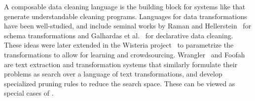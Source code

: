 
 A composable data cleaning language is the building block for systems like \sys that generate understandable cleaning programs.   Languages for data transformations have been well-studied, and include seminal works by Raman and Hellerstein~\cite{raman2001potter} for schema transformations and Galhardas et al.~\cite{DBLP:conf/vldb/GalhardasFSSS01} for declarative data cleaning. These ideas were later extended in the Wisteria project~\cite{DBLP:journals/pvldb/HaasKWF015} to parametrize the transformations to allow for learning and crowdsourcing.   Wrangler~\cite{wrangler} and Foofah~\cite{jin2017foofah} are text extraction and transformation systems that similarly formulate their problems as search over a language of text transformations, and develop specialized pruning rules to reduce the search space.   These can be viewed as special cases of \sys.



